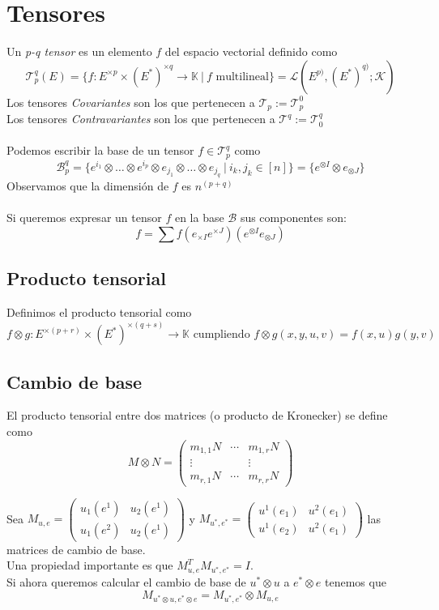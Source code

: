 \documentclass{myclass}
\newcommand{\T}{\mathcal{T}}
\newcommand{\st}{\ | \ }
\begin{document}
\section{Tensores}
Un \textit{p-q tensor} es un elemento $f$ del espacio vectorial definido como
$$
\boxed{\T_p^q(E)=\{ f: E^{\times p}\times (E^*)^{\times q} \to \mathbb{K} \st f \text{ multilineal}\} = \mathcal{L}(E^{p)}, (E^*)^{q)};\mathcal{K})}
$$
Los tensores \textit{Covariantes} son los que pertenecen a $\T_p:=\T_p^0$ \\
Los tensores \textit{Contravariantes} son los que pertenecen a $\T^q:=\T_0^q$ \\
\\
Podemos escribir la base de un tensor $f\in \T_p^q$ como
$$
\mathcal{B}_p^q=\{e^{i_1}\otimes \ldots \otimes e^{i_p}\otimes e_{j_1}\otimes \ldots \otimes e_{j_q} \st i_k, j_k\in [n]\} = \{e^{\otimes I}\otimes e_{\otimes J}\}
$$
Observamos que la dimensión de $f$ es $n^{(p+q)}$\\
\\
Si queremos expresar un tensor $f$ en la base $\mathcal{B}$ sus componentes son:
\[
  f= \sum f(e_{\times I}e^{\times J})(e^{\otimes I}e_{\otimes J})
\] 

\subsection{Producto tensorial}
Definimos el producto tensorial como
$$
f\otimes g:E^{\times(p+r)}\times (E^*)^{\times(q+s)} \to \mathbb{K} \text{ cumpliendo } \boxed{f\otimes g (x, y, u, v) = f(x, u)g(y,v)  }  
$$

\subsection{Cambio de base}
El producto tensorial entre dos matrices (o producto de Kronecker) se define como
$$
M\otimes N = \begin{pmatrix}
m_{1,1}N & \cdots & m_{1,r}N\\
\vdots &  & \vdots \\
m_{r,1}N & \cdots & m_{r,r}N
\end{pmatrix}
$$

Sea $M_{u, e} = \begin{pmatrix}
u_1(e^1) & u_2(e^1) \\
u_1(e^2) & u_2(e^1)
\end{pmatrix}$ y $M_{u^*, e^*} = \begin{pmatrix}
u^1(e_1) & u^2(e_1) \\
u^1(e_2) & u^2(e_1)
\end{pmatrix}$ las matrices de cambio de base.\\
Una propiedad importante es que $M_{u, e}^TM_{u^*, e^*} = I$.
\\
Si ahora queremos calcular el cambio de base de $u^*\otimes u$ a $e^*\otimes e$ tenemos que
$$
M_{u^*\otimes u, e^*\otimes e} = M_{u^*, e^*}\otimes M_{u,e}
$$
\end{document}

